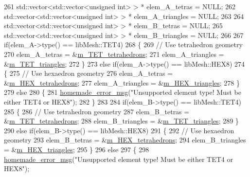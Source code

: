\begin{DoxyCode}
261         std::vector<std::vector<unsigned int> > * elem\_A\_tetras    = NULL;
262         std::vector<std::vector<unsigned int> > * elem\_A\_triangles = NULL;
263 
264         std::vector<std::vector<unsigned int> > * elem\_B\_tetras    = NULL;
265         std::vector<std::vector<unsigned int> > * elem\_B\_triangles = NULL;
266 
267         \textcolor{keywordflow}{if}(elem\_A->type() == libMesh::TET4)
268         \{
269             \textcolor{comment}{// Use tetrahedron geometry}
270             elem\_A\_tetras = &\hyperlink{classcarl_1_1_intersection___tools_a6e9a49f3b382810c884ba46b791bfcb8}{m\_TET\_tetrahedrons};
271             elem\_A\_triangles = &\hyperlink{classcarl_1_1_intersection___tools_a54e026b256ab6894b1f77950a425b1eb}{m\_TET\_triangles};
272         \}
273         \textcolor{keywordflow}{else} \textcolor{keywordflow}{if}(elem\_A->type() == libMesh::HEX8)
274         \{
275             \textcolor{comment}{// Use hexaedron geometry}
276             elem\_A\_tetras = &\hyperlink{classcarl_1_1_intersection___tools_af74ec1bcb1a896df19642d340dd2762c}{m\_HEX\_tetrahedrons};
277             elem\_A\_triangles = &\hyperlink{classcarl_1_1_intersection___tools_aca79d0350f0969670dd9d06814c26583}{m\_HEX\_triangles};
278         \}
279         \textcolor{keywordflow}{else}
280         \{
281             \hyperlink{common__header_8h_a05d65d26b911668ac90085745dca71f6}{homemade\_error\_msg}(\textcolor{stringliteral}{"Unsupported element type! Must be either TET4 or HEX8"});
282         \}
283 
284         \textcolor{keywordflow}{if}(elem\_B->type() == libMesh::TET4)
285         \{
286             \textcolor{comment}{// Use tetrahedron geometry}
287             elem\_B\_tetras = &\hyperlink{classcarl_1_1_intersection___tools_a6e9a49f3b382810c884ba46b791bfcb8}{m\_TET\_tetrahedrons};
288             elem\_B\_triangles = &\hyperlink{classcarl_1_1_intersection___tools_a54e026b256ab6894b1f77950a425b1eb}{m\_TET\_triangles};
289         \}
290         \textcolor{keywordflow}{else} \textcolor{keywordflow}{if}(elem\_B->type() == libMesh::HEX8)
291         \{
292             \textcolor{comment}{// Use hexaedron geometry}
293             elem\_B\_tetras = &\hyperlink{classcarl_1_1_intersection___tools_af74ec1bcb1a896df19642d340dd2762c}{m\_HEX\_tetrahedrons};
294             elem\_B\_triangles = &\hyperlink{classcarl_1_1_intersection___tools_aca79d0350f0969670dd9d06814c26583}{m\_HEX\_triangles};
295         \}
296         \textcolor{keywordflow}{else}
297         \{
298             \hyperlink{common__header_8h_a05d65d26b911668ac90085745dca71f6}{homemade\_error\_msg}(\textcolor{stringliteral}{"Unsupported element type! Must be either TET4 or HEX8"});

\end{DoxyCode}
